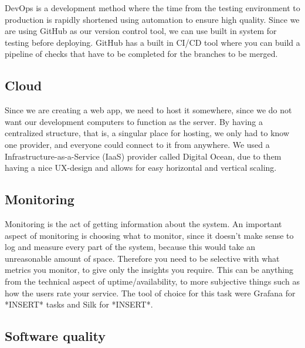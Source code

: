 DevOps is a development method where the time from the testing environment to production is rapidly shortened using automation to ensure high quality. Since we are using GitHub as our version control tool, we can use built in system for testing before deploying. GitHub has a built in CI/CD tool where you can build a pipeline of checks that have to be completed for the branches to be merged.

\subsection*{Cloud}

Since we are creating a web app, we need to host it somewhere, since we do not want our development computers to function as the server. By having a centralized structure, that is, a singular place for hosting, we only had to know one provider, and everyone could connect to it from anywhere. We used a Infrastructure-as-a-Service (IaaS) provider called Digital Ocean, due to them having a nice UX-design and allows for easy horizontal and vertical scaling.

\subsection*{Monitoring}

Monitoring is the act of getting information about the system. An important aspect of monitoring is choosing what to monitor, since it doesn't make sense to log and measure every part of the system, because this would take an unreasonable amount of space. Therefore you need to be selective with what metrics you monitor, to give only the insights you require. This can be anything from the technical aspect of uptime/availability, to more subjective things such as how the users rate your service. The tool of choice for this task were Grafana for *INSERT* tasks and Silk for *INSERT*.

\subsection*{Software quality}


